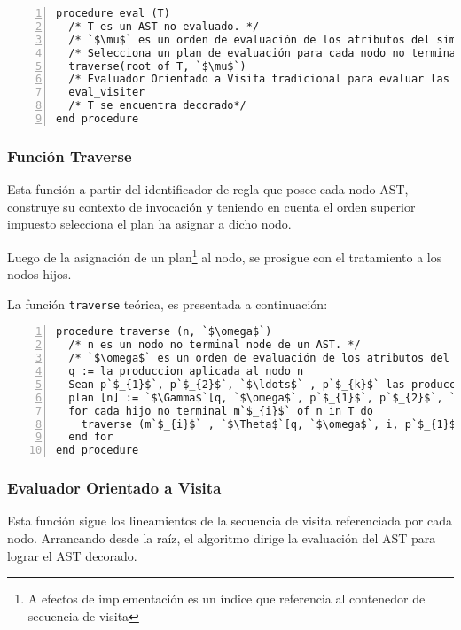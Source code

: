 \documentclass[runningheads,a4paper]{llncs}
\begin{document}
\begin{lstlisting}[numbers=left, columns=fullflexible]
procedure eval (T)
  /* T es un AST no evaluado. */
  /* `$\mu$` es un orden de evaluación de los atributos del simbolo inicial. */
  /* Selecciona un plan de evaluación para cada nodo no terminal en T. */
  traverse(root of T, `$\mu$`)
  /* Evaluador Orientado a Visita tradicional para evaluar las instancias de atributos de T.*/
  eval_visiter 
  /* T se encuentra decorado*/
end procedure
\end{lstlisting}

\subsubsection{Función Traverse}

Esta función a partir del identificador de regla que posee cada nodo AST, construye su contexto de invocación y teniendo en cuenta el orden superior impuesto selecciona el plan ha asignar a dicho nodo.

Luego de la asignación de un plan\footnote{A efectos de implementación es un índice que referencia al contenedor de secuencia de visita} al nodo, se prosigue con el tratamiento a los nodos hijos.

La función \texttt{traverse} teórica, es presentada a continuación:

\begin{lstlisting}[numbers=left, columns=fullflexible]
procedure traverse (n, `$\omega$`)
  /* n es un nodo no terminal node de un AST. */
  /* `$\omega$` es un orden de evaluación de los atributos del simbolo no terminal de mas a izquierda localizado en n. */
  q := la produccion aplicada al nodo n
  Sean p`$_{1}$`, p`$_{2}$`, `$\ldots$` , p`$_{k}$` las producciones aplicadas a los nodos hijos no terminales de n.
  plan [n] := `$\Gamma$`[q, `$\omega$`, p`$_{1}$`, p`$_{2}$`, `$\ldots$` , p`$_{k}$`]
  for cada hijo no terminal m`$_{i}$` of n in T do
    traverse (m`$_{i}$` , `$\Theta$`[q, `$\omega$`, i, p`$_{1}$`, p`$_{2}$`, `$\ldots$` , p`$_{k}$`])
  end for
end procedure
\end{lstlisting}

\subsubsection{Evaluador Orientado a Visita}

Esta función sigue los lineamientos de la secuencia de visita referenciada por cada nodo. Arrancando desde la raíz, el algoritmo dirige la evaluación del AST para lograr el AST decorado.
\end{document}
